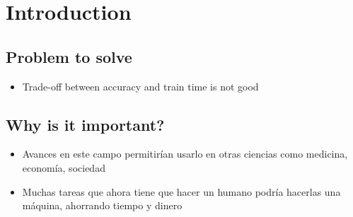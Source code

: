 
\chapter{Introduction} %

\label{Chapter1} %



\section{Problem to solve}

\begin{note}
  \begin{itemize}
    \item Trade-off between accuracy and train time is not good
  \end{itemize}
\end{note}




\section{Why is it important?}

\begin{note}
  \begin{itemize}
    \item Avances en este campo permitirían usarlo en otras ciencias como medicina,
    economía, sociedad
    \item Muchas tareas que ahora tiene que hacer un humano podría hacerlas una
    máquina, ahorrando tiempo y dinero
  \end{itemize}
\end{note}




